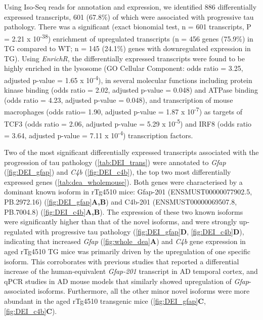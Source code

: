 Using Iso-Seq reads for annotation and expression, we identified 886 differentially expressed transcripts, 601 (67.8\%) of which were associated with progressive tau pathology. There was a significant (exact bionomial test, n = 601 transcripts, P = 2.21 x 10\textsuperscript{-38}) enrichment of upregulated transcripts (n = 456 genes (75.9\%) in TG compared to WT; n = 145 (24.1\%) genes with downregulated expression in TG). Using \textit{EnrichR}, the differentially expressed transcripts were found to be highly enriched in the lysosome (GO Cellular Component: odds ratio = 3.25, adjusted p-value = 1.65 x 10\textsuperscript{-4}), in several molecular functions including protein kinase binding (odds ratio = 2.02, adjusted p-value = 0.048) and ATPase binding (odds ratio = 4.23, adjusted p-value = 0.048), and transcription of mouse macrophages (odds ratio= 1.90, adjusted p-value = 1.87 x 10\textsuperscript{-7}) as targets of TCF3 (odds ratio = 2.06, adjusted p-value = 5.29 x 10\textsuperscript{-5}) and IRF8 (odds ratio = 3.64, adjusted p-value = 7.11 x 10\textsuperscript{-4}) transcription factors.  

Two of the most significant differentially expressed transcripts associated with the progression of tau pathology (\cref{tab:DEI_trans}) were annotated to \textit{Gfap} (\cref{fig:DEI_gfap}) and \textit{C4b} (\cref{fig:DEI_c4b}), the top two most differentially expressed genes (\cref{tab:dea_wholemouse}). Both genes were characterised by a dominant known isoform in rTg4510 mice: Gfap-201 (ENSMUST00000077902.5, PB.2972.16) (\cref{fig:DEI_gfap}\textbf{A,B}) and C4b-201 (ENSMUST00000069507.8, PB.7004.8) (\cref{fig:DEI_c4b}\textbf{A,B}). The expression of these two known isoforms were significantly higher than that of the novel isoforms, and were strongly up-regulated with progressive tau pathology (\cref{fig:DEI_gfap}\textbf{D}, \cref{fig:DEI_c4b}\textbf{D}), indicating that increased \textit{Gfap} (\cref{fig:whole_dea}\textbf{A}) and \textit{C4b} gene expression in aged rTg4510 TG mice was primarily driven by the upregulation of one specific isoform. This corroborates with previous studies that reported a differential increase of the human-equivalent \textit{Gfap-201} transcript in AD temporal cortex\cite{Roelofs2005}, and qPCR studies in AD mouse models that similarly showed upregulation of \textit{Gfap}-associated isoforms\cite{Kamphuis2012}. Furthermore, all the other minor novel isoforms were more abundant in the aged rTg4510 transgenic mice (\cref{fig:DEI_gfap}\textbf{C}, \cref{fig:DEI_c4b}\textbf{C}).


